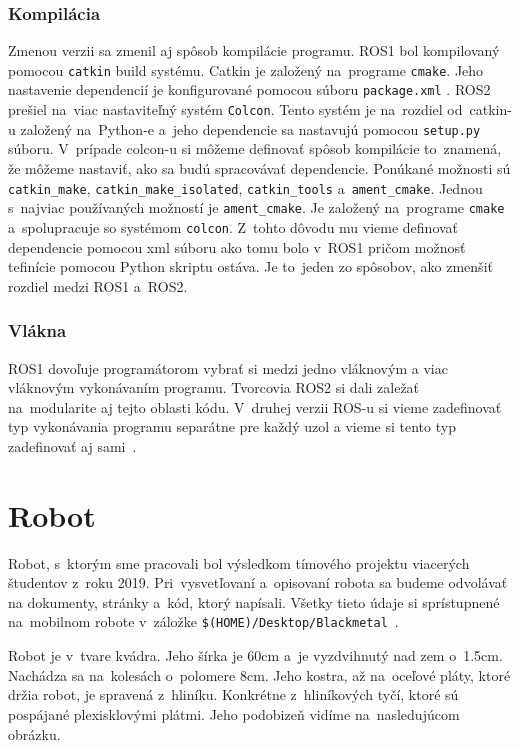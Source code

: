 \subsubsection{Kompilácia}

	Zmenou verzii sa zmenil aj spôsob kompilácie programu. ROS1 bol kompilovaný pomocou \texttt{catkin} build systému. Catkin je založený
	na~programe \texttt{cmake}. Jeho nastavenie dependencií je konfigurované pomocou súboru \texttt{package.xml} . ROS2 prešiel na~viac
	nastaviteľný systém \texttt{Colcon}. Tento systém je na~rozdiel od~catkin-u založený na~Python-e a~jeho dependencie sa nastavujú pomocou
	\texttt{setup.py} súboru. V~prípade colcon-u si môžeme definovať spôsob kompilácie to~znamená, že môžeme nastaviť, ako sa budú spracovávať
	dependencie. Ponúkané možnosti sú \texttt{catkin\_make}, \texttt{catkin\_make\_isolated}, \texttt{catkin\_tools} a~\texttt{ament\_cmake}.
	Jednou s~najviac používaných možností je \texttt{ament\_cmake}. Je založený na~programe \texttt{cmake} a~spolupracuje so systémom \texttt{colcon}.
	Z~tohto dôvodu mu vieme definovať dependencie pomocou xml súboru ako tomu bolo v~ROS1 pričom možnosť tefinície pomocou Python skriptu ostáva.
	Je to~jeden zo spôsobov, ako zmenšiť rozdiel medzi ROS1 a~ROS2.

\subsubsection{Vlákna}

	ROS1 dovoľuje programátorom vybrať si medzi jedno vláknovým a viac vláknovým vykonávaním programu. Tvorcovia ROS2 si dali zaležať na~modularite
	aj tejto oblasti kódu. V~druhej verzii ROS-u si vieme zadefinovať typ vykonávania programu separátne pre každý uzol a vieme si tento typ
	zadefinovať aj sami~\cite{ROS2design}.

\section{Robot}

Robot, s~ktorým sme pracovali bol výsledkom tímového projektu viacerých študentov \newline z~roku 2019. Pri~vysvetľovaní a~opisovaní robota sa budeme
odvolávať na dokumenty, stránky a~kód, ktorý napísali. Všetky tieto údaje si sprístupnené na~mobilnom robote v~záložke
\newline \texttt{\$(HOME)/Desktop/Blackmetal}~\cite{timovyProjekt}.

Robot je v~tvare kvádra. Jeho šírka je 60cm a~je vyzdvihnutý nad zem o~1.5cm. Nachádza sa na~kolesách o~polomere 8cm. Jeho kostra, až na~oceľové pláty,
ktoré držia robot, je spravená z~hliníku. Konkrétne z~hliníkových tyčí, ktoré sú pospájané plexisklovými plátmi. Jeho podobizeň vidíme na~nasledujúcom
obrázku.

